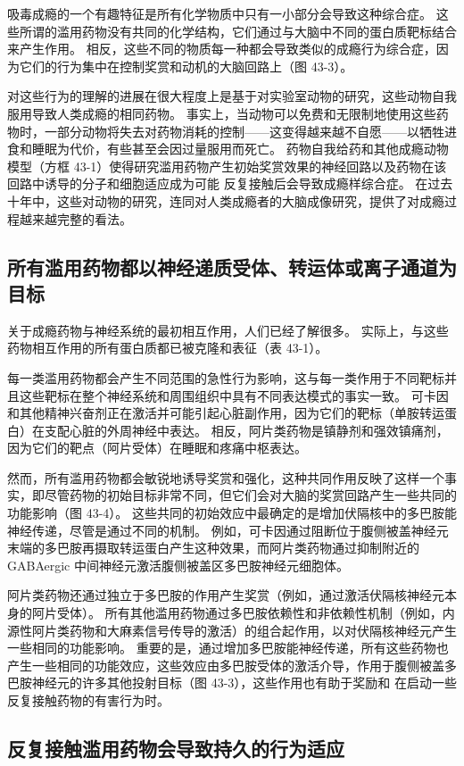 吸毒成瘾的一个有趣特征是所有化学物质中只有一小部分会导致这种综合症。 这些所谓的滥用药物没有共同的化学结构，它们通过与大脑中不同的蛋白质靶标结合来产生作用。 相反，这些不同的物质每一种都会导致类似的成瘾行为综合症，因为它们的行为集中在控制奖赏和动机的大脑回路上（图 43-3）。

对这些行为的理解的进展在很大程度上是基于对实验室动物的研究，这些动物自我服用导致人类成瘾的相同药物。 事实上，当动物可以免费和无限制地使用这些药物时，一部分动物将失去对药物消耗的控制——这变得越来越不自愿——以牺牲进食和睡眠为代价，有些甚至会因过量服用而死亡。 药物自我给药和其他成瘾动物模型（方框 43-1）使得研究滥用药物产生初始奖赏效果的神经回路以及药物在该回路中诱导的分子和细胞适应成为可能 反复接触后会导致成瘾样综合症。 在过去十年中，这些对动物的研究，连同对人类成瘾者的大脑成像研究，提供了对成瘾过程越来越完整的看法。

\subsection{所有滥用药物都以神经递质受体、转运体或离子通道为目标}
关于成瘾药物与神经系统的最初相互作用，人们已经了解很多。 实际上，与这些药物相互作用的所有蛋白质都已被克隆和表征（表 43-1）。

每一类滥用药物都会产生不同范围的急性行为影响，这与每一类作用于不同靶标并且这些靶标在整个神经系统和周围组织中具有不同表达模式的事实一致。 可卡因和其他精神兴奋剂正在激活并可能引起心脏副作用，因为它们的靶标（单胺转运蛋白）在支配心脏的外周神经中表达。 相反，阿片类药物是镇静剂和强效镇痛剂，因为它们的靶点（阿片受体）在睡眠和疼痛中枢表达。

然而，所有滥用药物都会敏锐地诱导奖赏和强化，这种共同作用反映了这样一个事实，即尽管药物的初始目标非常不同，但它们会对大脑的奖赏回路产生一些共同的功能影响（图 43-4）。 这些共同的初始效应中最确定的是增加伏隔核中的多巴胺能神经传递，尽管是通过不同的机制。 例如，可卡因通过阻断位于腹侧被盖神经元末端的多巴胺再摄取转运蛋白产生这种效果，而阿片类药物通过抑制附近的 GABAergic 中间神经元激活腹侧被盖区多巴胺神经元细胞体。

阿片类药物还通过独立于多巴胺的作用产生奖赏（例如，通过激活伏隔核神经元本身的阿片受体）。 所有其他滥用药物通过多巴胺依赖性和非依赖性机制（例如，内源性阿片类药物和大麻素信号传导的激活）的组合起作用，以对伏隔核神经元产生一些相同的功能影响。 重要的是，通过增加多巴胺能神经传递，所有这些药物也产生一些相同的功能效应，这些效应由多巴胺受体的激活介导，作用于腹侧被盖多巴胺神经元的许多其他投射目标（图 43-3），这些作用也有助于奖励和 在启动一些反复接触药物的有害行为时。

\subsection{反复接触滥用药物会导致持久的行为适应}


